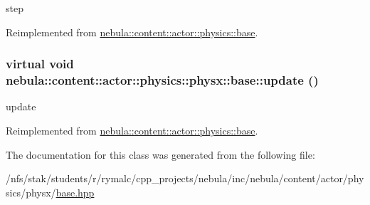 step 

Reimplemented from \hyperlink{classnebula_1_1content_1_1actor_1_1physics_1_1base_aac025359e301532039709ea8697bb29f}{nebula::content::actor::physics::base}.\hypertarget{classnebula_1_1content_1_1actor_1_1physics_1_1physx_1_1base_a44919981abb6410c7c635d6e1ea96423}{
\subsubsection[{update}]{\setlength{\rightskip}{0pt plus 5cm}virtual void nebula::content::actor::physics::physx::base::update ()}}
\label{classnebula_1_1content_1_1actor_1_1physics_1_1physx_1_1base_a44919981abb6410c7c635d6e1ea96423}


update 

Reimplemented from \hyperlink{classnebula_1_1content_1_1actor_1_1physics_1_1base_a468da70c6f6c2520b458662ab97b76e5}{nebula::content::actor::physics::base}.

The documentation for this class was generated from the following file:\begin{DoxyCompactItemize}
\item 
/nfs/stak/students/r/rymalc/cpp\_\-projects/nebula/inc/nebula/content/actor/physics/physx/\hyperlink{inc_2nebula_2content_2actor_2physics_2physx_2base_8hpp}{base.hpp}\end{DoxyCompactItemize}
